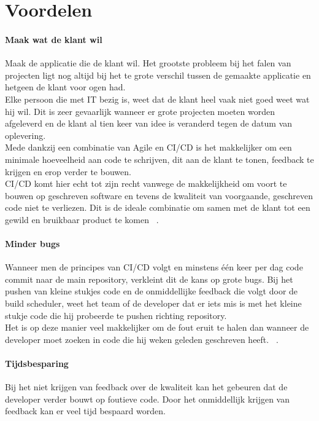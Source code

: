     \section{Voordelen}
        \paragraph[Maak wat de klant wil]{Maak wat de klant wil}
            Maak de applicatie die de klant wil. Het grootste probleem bij het falen van projecten ligt nog altijd bij het te grote verschil tussen de gemaakte applicatie en hetgeen de klant voor ogen had.\\
            Elke persoon die met IT bezig is, weet dat de klant heel vaak niet goed weet wat hij wil. Dit is zeer gevaarlijk wanneer er grote projecten moeten worden afgeleverd en de klant al tien keer van idee is veranderd tegen de datum van oplevering.\\
            Mede dankzij een combinatie van Agile en CI/CD is het makkelijker om een minimale hoeveelheid aan code te schrijven, dit aan de klant te tonen, feedback te krijgen en erop verder te bouwen.\\
            CI/CD komt hier echt tot zijn recht vanwege de makkelijkheid om voort te bouwen op geschreven software en tevens de kwaliteit van voorgaande, geschreven code niet te verliezen. Dit is de ideale combinatie om samen met de klant tot een gewild en bruikbaar product te komen ~\autocite{Humble2012}.
            
        \paragraph[Minder bugs]{Minder bugs}
            Wanneer men de principes van CI/CD volgt en minstens één keer per dag code commit naar de main repository, verkleint dit de kans op grote bugs. Bij het pushen van kleine stukjes code en de onmiddellijke feedback die volgt door de build scheduler, weet het team of de developer dat er iets mis is met het kleine stukje code die hij probeerde te pushen richting repository.\\
            Het is op deze manier veel makkelijker om de fout eruit te halen dan wanneer de developer moet zoeken in code die hij weken geleden geschreven heeft. ~\autocite{Fowler2006}.
        
        \paragraph[Tijdsbesparing]{Tijdsbesparing}
            Bij het niet krijgen van feedback over de kwaliteit kan het gebeuren dat de developer verder bouwt op foutieve code. Door het onmiddellijk krijgen van feedback kan er veel tijd bespaard worden.
        
